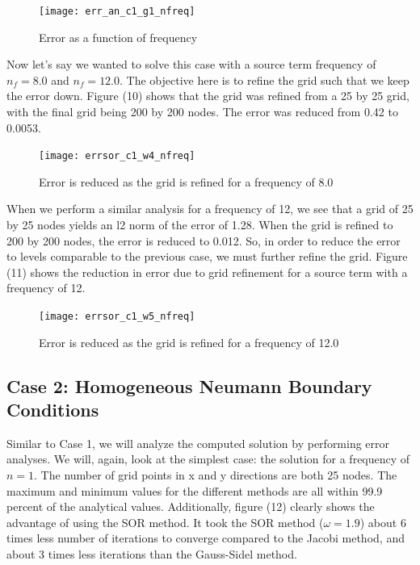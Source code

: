 \documentclass{article}
\begin{document}
\begin{figure}[H]
\centering
\texttt{[image: err\_an\_c1\_g1\_nfreq]}\label{Algebraic Convergence}
\caption{Error as a function of frequency }
\end{figure}

\vspace{1em}

\noindent Now let's say we wanted to solve this case with a source term frequency of $n_f= 8.0$ and $n_f = 12.0$. The objective here is to refine the grid such that we keep the error down. Figure (10) shows that the grid was refined from a 25 by 25 grid, with the final grid being 200 by 200 nodes. The error was reduced from 0.42 to 0.0053.

\begin{figure}[H]
\centering
\texttt{[image: errsor\_c1\_w4\_nfreq]}\label{Algebraic Convergence}
\caption{Error is reduced as the grid is refined for a frequency of 8.0}
\end{figure}

\vspace{1em}

\noindent When we perform a similar analysis for a frequency of 12, we see that a grid of 25 by 25 nodes yields an l2 norm of the error of 1.28. When the grid is refined to 200 by 200 nodes, the error is reduced to 0.012. So, in order to reduce the error to levels comparable to the previous case, we must further refine the grid. Figure (11) shows the reduction in error due to grid refinement for a source term with a frequency of 12.

\begin{figure}[H]
\centering
\texttt{[image: errsor\_c1\_w5\_nfreq]}\label{Algebraic Convergence}
\caption{Error is reduced as the grid is refined for a frequency of 12.0}
\end{figure}

\vspace{1em}

\subsection{Case 2: Homogeneous Neumann Boundary Conditions}

\noindent Similar to Case 1, we will analyze the computed solution by performing error analyses. We will, again, look at the simplest case: the solution for a frequency of $n = 1$. The number of grid points in x and y directions are both 25  nodes. The maximum and minimum values for the different methods are all within 99.9 percent of the analytical values. Additionally, figure (12) clearly shows the advantage of using the SOR method. It took the SOR method ($\omega = 1.9$) about 6 times less number of iterations to converge compared to the Jacobi method, and about 3 times less iterations than the Gauss-Sidel method.
\end{document}
